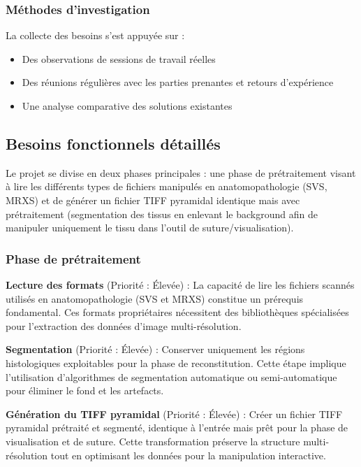 \documentclass[12pt,a4paper]{report}
\begin{document}
\subsubsection{Méthodes d'investigation}

La collecte des besoins s'est appuyée sur :
\begin{itemize}
\item Des observations de sessions de travail réelles
\item Des réunions régulières avec les parties prenantes et retours d'expérience
\item Une analyse comparative des solutions existantes
\end{itemize}

\subsection{Besoins fonctionnels détaillés}

Le projet se divise en deux phases principales : une phase de prétraitement visant à lire les différents types de fichiers manipulés en anatomopathologie (SVS, MRXS) et de générer un fichier TIFF pyramidal identique mais avec prétraitement (segmentation des tissus en enlevant le background afin de manipuler uniquement le tissu dans l'outil de suture/visualisation).

\subsubsection{Phase de prétraitement}

\textbf{Lecture des formats} (Priorité : Élevée) : La capacité de lire les fichiers scannés utilisés en anatomopathologie (SVS et MRXS) constitue un prérequis fondamental. Ces formats propriétaires nécessitent des bibliothèques spécialisées pour l'extraction des données d'image multi-résolution.

\textbf{Segmentation} (Priorité : Élevée) : Conserver uniquement les régions histologiques exploitables pour la phase de reconstitution. Cette étape implique l'utilisation d'algorithmes de segmentation automatique ou semi-automatique pour éliminer le fond et les artefacts.

\textbf{Génération du TIFF pyramidal} (Priorité : Élevée) : Créer un fichier TIFF pyramidal prétraité et segmenté, identique à l'entrée mais prêt pour la phase de visualisation et de suture. Cette transformation préserve la structure multi-résolution tout en optimisant les données pour la manipulation interactive.
\end{document}
